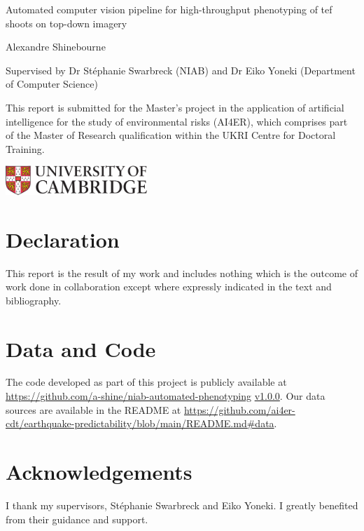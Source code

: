 \begin{titlepage}
\begin{center}
\vspace*{1cm}

{\huge Automated computer vision pipeline for high-throughput phenotyping of tef shoots on top-down imagery}
    
\vspace{1.5cm}

Alexandre Shinebourne

Supervised by Dr Stéphanie Swarbreck (NIAB) and Dr Eiko Yoneki (Department of Computer Science)

\vfill

This report is submitted for the Master's project in the application of artificial intelligence for the study of environmental risks (AI4ER), which comprises part of the Master of Research qualification within the UKRI Centre for Doctoral Training.
    
\vspace{1.5cm}

\includegraphics[width=0.4\textwidth]{assets/University_of_Cambridge_logo.png}

\vspace{0.8cm}

    
\end{center}

\newpage

\section*{Declaration}

This report is the result of my work and includes nothing which is the outcome of work done in collaboration except where expressly indicated in the text and bibliography.

\section*{Data and Code}

The code developed as part of this project is publicly available at \url{https://github.com/a-shine/niab-automated-phenotyping} \href{https://github.com/ai4er-cdt/earthquake-predictability/tree/v1.0.0}{v1.0.0}. Our data sources are available in the README at \url{https://github.com/ai4er-cdt/earthquake-predictability/blob/main/README.md#data}.

\section*{Acknowledgements}

I thank my supervisors, Stéphanie Swarbreck and Eiko Yoneki. I greatly benefited from their guidance and support.

\end{titlepage}
